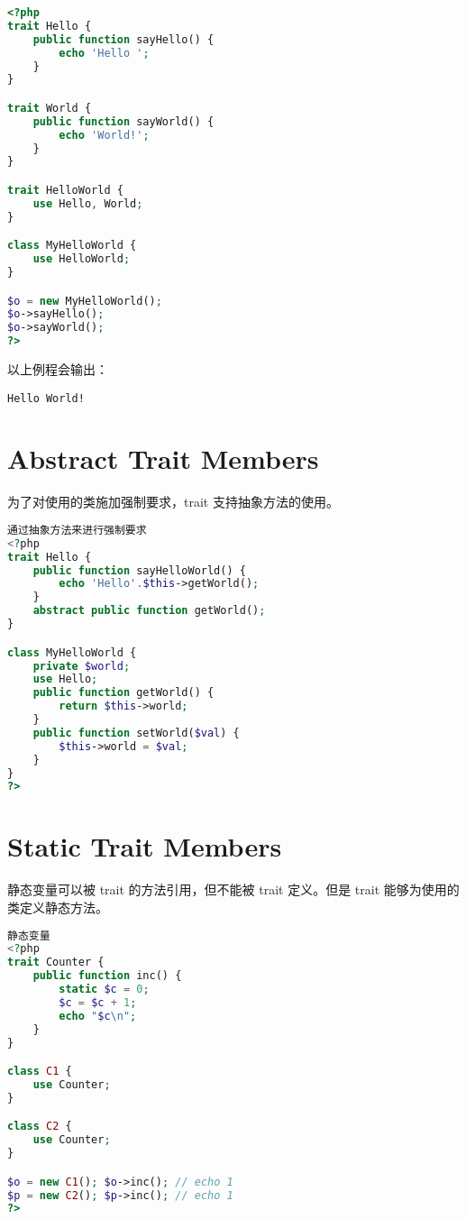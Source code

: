 \begin{lstlisting}[language=PHP]
<?php
trait Hello {
    public function sayHello() {
        echo 'Hello ';
    }
}

trait World {
    public function sayWorld() {
        echo 'World!';
    }
}

trait HelloWorld {
    use Hello, World;
}

class MyHelloWorld {
    use HelloWorld;
}

$o = new MyHelloWorld();
$o->sayHello();
$o->sayWorld();
?>
\end{lstlisting}

以上例程会输出：

\begin{verbatim}
Hello World!
\end{verbatim}




\section{Abstract Trait Members}



为了对使用的类施加强制要求，trait 支持抽象方法的使用。



\begin{lstlisting}[language=PHP]
通过抽象方法来进行强制要求
<?php
trait Hello {
    public function sayHelloWorld() {
        echo 'Hello'.$this->getWorld();
    }
    abstract public function getWorld();
}

class MyHelloWorld {
    private $world;
    use Hello;
    public function getWorld() {
        return $this->world;
    }
    public function setWorld($val) {
        $this->world = $val;
    }
}
?>
\end{lstlisting}






\section{Static Trait Members}

静态变量可以被 trait 的方法引用，但不能被 trait 定义。但是 trait 能够为使用的类定义静态方法。


\begin{lstlisting}[language=PHP]
静态变量
<?php
trait Counter {
    public function inc() {
        static $c = 0;
        $c = $c + 1;
        echo "$c\n";
    }
}

class C1 {
    use Counter;
}

class C2 {
    use Counter;
}

$o = new C1(); $o->inc(); // echo 1
$p = new C2(); $p->inc(); // echo 1
?>
\end{lstlisting}



